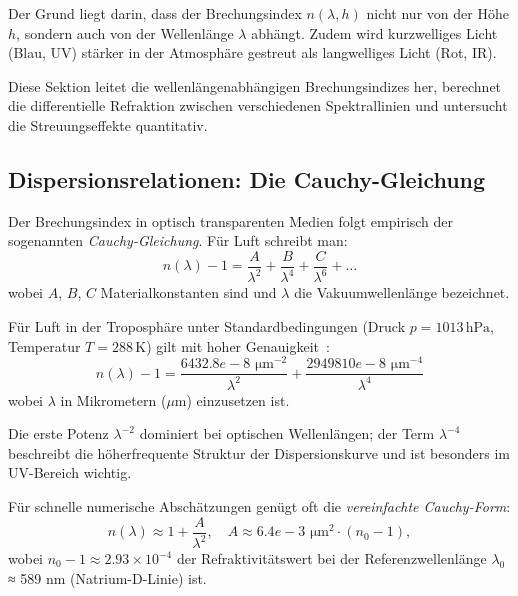 \documentclass[12pt,a4paper]{article}
\providecommand{\SI}[2]{\ensuremath{#1\,#2}}
\providecommand{\hecto}{\mathrm{h}}
\providecommand{\micro}{\mathrm{\mu}}
\providecommand{\metre}{\mathrm{m}}
\providecommand{\pascal}{\mathrm{Pa}}
\providecommand{\kelvin}{\mathrm{K}}
\begin{document}
Der Grund liegt darin, dass der Brechungsindex $n(\lambda, h)$ nicht nur
von der Höhe $h$, sondern auch von der Wellenlänge $\lambda$ abhängt.
Zudem wird kurzwelliges Licht (Blau, UV) stärker in der Atmosphäre
gestreut als langwelliges Licht (Rot, IR).

Diese Sektion leitet die wellenlängenabhängigen Brechungsindizes her,
berechnet die differentielle Refraktion zwischen verschiedenen
Spektrallinien und untersucht die Streuungseffekte quantitativ.

\subsection{Dispersionsrelationen: Die Cauchy-Gleichung}
\label{subsec:cauchy}

Der Brechungsindex in optisch transparenten Medien folgt empirisch
der sogenannten \emph{Cauchy-Gleichung}. Für Luft schreibt man:
\begin{equation}
	n(\lambda) - 1 = \frac{A}{\lambda^2} + \frac{B}{\lambda^4} + \frac{C}{\lambda^6} + \ldots
	\label{eq:cauchy_allg}
\end{equation}
wobei $A$, $B$, $C$ Materialkonstanten sind und $\lambda$ die
Vakuumwellenlänge bezeichnet.

Für Luft in der Troposphäre unter Standardbedingungen
(Druck $p = \SI{1013}{\hecto\pascal}$, Temperatur $T = \SI{288}{\kelvin}$)
gilt mit hoher Genauigkeit~\citep{Edlen1966}:
\begin{equation}
	n(\lambda) - 1 = \frac{\SI{6432.8e-8}{\,\micro\metre^{-2}}}{\lambda^2} 
	+ \frac{\SI{2949810e-8}{\,\micro\metre^{-4}}}{\lambda^4}
	\label{eq:cauchy_luft}
\end{equation}
wobei $\lambda$ in Mikrometern ($\mu$m) einzusetzen ist.

Die erste Potenz $\lambda^{-2}$ dominiert bei optischen Wellenlängen;
der Term $\lambda^{-4}$ beschreibt die höherfrequente Struktur der
Dispersionskurve und ist besonders im UV-Bereich wichtig.

Für schnelle numerische Abschätzungen genügt oft die \emph{vereinfachte Cauchy-Form}:
\begin{equation}
	n(\lambda) \approx 1 + \frac{A}{\lambda^2},
	\quad A \approx \SI{6.4e-3}{\,\micro\metre^{2}} \cdot (n_0 - 1),
	\label{eq:cauchy_simp}
\end{equation}
wobei $n_0 - 1 \approx 2.93 \times 10^{-4}$ der Refraktivitätswert
bei der Referenzwellenlänge $\lambda_0$ ≈ 589 nm (Natrium-D-Linie) ist.
\end{document}
